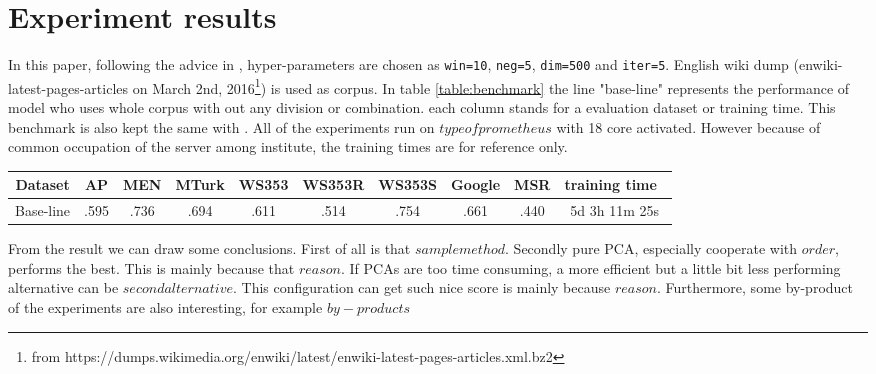 \section{Experiment results} \label{experiment_results}
In this paper, following the advice in \cite{levy2015improving}, hyper-parameters are chosen as \verb|win=10|, \verb|neg=5|, \verb|dim=500| and \verb|iter=5|. English wiki dump (enwiki-latest-pages-articles on March 2nd, 2016\footnote{from https://dumps.wikimedia.org/enwiki/latest/enwiki-latest-pages-articles.xml.bz2}) is used as corpus. In table \ref{table:benchmark} the line "base-line" represents the performance of model who uses whole corpus with out any division or combination. each column stands for a evaluation dataset or training time. This benchmark is also kept the same with \cite{levy2015improving}. All of the experiments run on $type of prometheus$ with 18 core activated. However because of common occupation of the server among institute, the training times are for reference only.

\begin{table*}
\caption{Performance and training time of different combination strategies}
\begin{tabular}{c|cccccccc|c}
\hline
Dataset   & AP   & MEN  & MTurk & WS353 & WS353R & WS353S & Google & MSR  & training time\ \tabularnewline \hline
Base-line & .595 & .736 & .694  & .611  & .514   & .754   & .661   & .440 & 5d 3h 11m 25s\\ \hline
\end{tabular}
\label{table:benchmark}
\end{table*}

From the result we can draw some conclusions. First of all is that $sample method$. Secondly pure PCA, especially cooperate with $order$, performs the best. This is mainly because that $reason$. If PCAs are too time consuming, a more efficient but a little bit less performing alternative can be $second alternative$. This configuration can get such nice score is mainly because $reason$. Furthermore, some by-product of the experiments are also interesting, for example $by-products$
